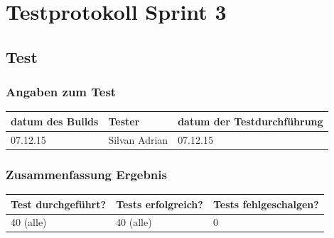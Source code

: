 \chapter{Testprotokoll Sprint 3}
\section{Test}
\subsection{Angaben zum Test}

\begin{tabularx}{\linewidth}{l l l}
\textbf{datum des Builds} & \textbf{Tester} & \textbf{datum der Testdurchführung}\\
\hline
07.12.15 & Silvan Adrian & 07.12.15

\end{tabularx}

\subsection{Zusammenfassung Ergebnis}
\begin{tabularx}{\linewidth}{l l l}
\textbf{Test durchgeführt?} & \textbf{Tests erfolgreich?} & \textbf{Tests fehlgeschalgen?}\\
\hline
40 (alle) & 40 (alle) & 0 \\
\hline
\end{tabularx}


